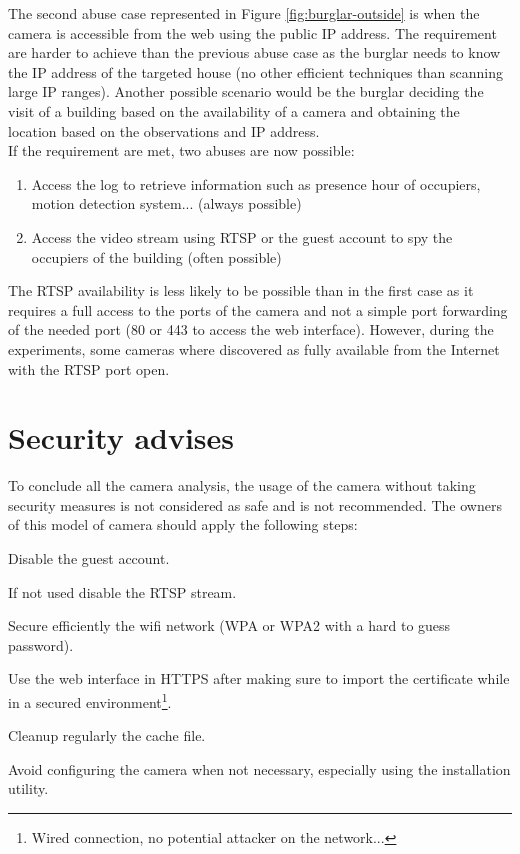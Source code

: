 The second abuse case represented in Figure \ref{fig:burglar-outside} is when the camera is accessible from the web using the public IP address.
The requirement are harder to achieve than the previous abuse case as the burglar needs to know the IP address of the targeted house (no other efficient techniques than scanning large IP ranges).
Another possible scenario would be the burglar deciding the visit of a building based on the availability of a camera and obtaining the location based on the observations and IP address.\\

If the requirement are met, two abuses are now possible:
\begin{enumerate}
\item Access the log to retrieve information such as presence hour of occupiers, motion detection system... (always possible)
\item Access the video stream using RTSP or the guest account to spy the occupiers of the building (often possible)
\end{enumerate}

The RTSP availability is less likely to be possible than in the first case as it requires a full access to the ports of the camera and not a simple port forwarding of the needed port (80 or 443 to access the web interface).
However, during the experiments, some cameras where discovered as fully available from the Internet with the RTSP port open.

\section{Security advises}
\label{sec:dcs-security}
To conclude all the camera analysis, the usage of the camera without taking security measures is not considered as safe and is not recommended.
The owners of this model of camera should apply the following steps:

\begin{itemizealt}
\item Disable the guest account.
\item If not used disable the RTSP stream.
\item Secure efficiently the wifi network (WPA or WPA2 with a hard to guess password).
\item Use the web interface in HTTPS after making sure to import the certificate while in a secured environment\footnote{Wired connection, no potential attacker on the network...}.
\item Cleanup regularly the cache file.
\item Avoid configuring the camera when not necessary, especially using the installation utility.
\end{itemizealt}

